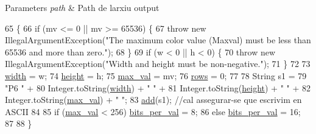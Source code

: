 \begin{DoxyParams}{Parameters}
{\em path} & Path de l\textquotesingle{}arxiu output \\
\hline
\end{DoxyParams}

\begin{DoxyCode}
65                                             \{
66         \textcolor{keywordflow}{if} (mv <= 0 || mv >= 65536) \{
67             \textcolor{keywordflow}{throw} \textcolor{keyword}{new} IllegalArgumentException(\textcolor{stringliteral}{"The maximum color value (Maxval) must be less than 65536
       and more than zero."});
68         \}
69         \textcolor{keywordflow}{if} (w < 0 || h < 0) \{
70             \textcolor{keywordflow}{throw} \textcolor{keyword}{new} IllegalArgumentException(\textcolor{stringliteral}{"Width and height must be non-negative."});
71         \}
72 
73         \hyperlink{classpersistencia_1_1output_1_1Ctrl__Output__Img_ae4a01ec459078cece4815d2fe7db8a64}{width} = w;
74         \hyperlink{classpersistencia_1_1output_1_1Ctrl__Output__Img_a1d7bc52c64c79e8545ae6d1ae8b9ee2e}{height} = h;
75         \hyperlink{classpersistencia_1_1output_1_1Ctrl__Output__Img_ab9e685dae026afe43188c62d7c4fad53}{max\_val} = mv;
76         \hyperlink{classpersistencia_1_1output_1_1Ctrl__Output__Img_a586ee8128a26b6786471e040a705bdbc}{rows} = 0;
77 
78         String s1 =
79             \textcolor{stringliteral}{"P6 "} +
80             Integer.toString(\hyperlink{classpersistencia_1_1output_1_1Ctrl__Output__Img_ae4a01ec459078cece4815d2fe7db8a64}{width}) + \textcolor{stringliteral}{" "} + 
81             Integer.toString(\hyperlink{classpersistencia_1_1output_1_1Ctrl__Output__Img_a1d7bc52c64c79e8545ae6d1ae8b9ee2e}{height}) + \textcolor{stringliteral}{" "} +
82             Integer.toString(\hyperlink{classpersistencia_1_1output_1_1Ctrl__Output__Img_ab9e685dae026afe43188c62d7c4fad53}{max\_val}) + \textcolor{stringliteral}{" "};
83         \hyperlink{classpersistencia_1_1output_1_1Ctrl__Output__Img_a305a977f4d4b999cf65e14e7106b6c5e}{add}(s1); \textcolor{comment}{//cal assegurar-se que escrivim en ASCII}
84 
85         \textcolor{keywordflow}{if} (\hyperlink{classpersistencia_1_1output_1_1Ctrl__Output__Img_ab9e685dae026afe43188c62d7c4fad53}{max\_val} < 256) \hyperlink{classpersistencia_1_1output_1_1Ctrl__Output__Img_ad40e63d16abd9058889249f5ad84f200}{bits\_per\_val} = 8;
86         \textcolor{keywordflow}{else}               \hyperlink{classpersistencia_1_1output_1_1Ctrl__Output__Img_ad40e63d16abd9058889249f5ad84f200}{bits\_per\_val} = 16;
87 
88     \}
\end{DoxyCode}



